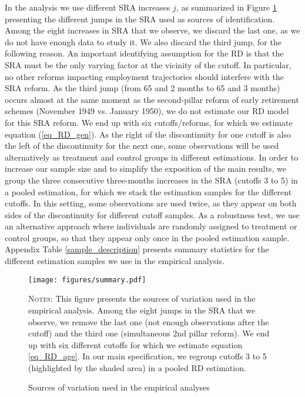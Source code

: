 \documentclass[12pt,a4paper]{article}
\begin{document}
In the analysis we use different SRA increases $j$, as summarized in Figure \ref{rdd_setup} presenting the different jumps in the SRA used as sources of identification. Among the eight increases in SRA that we observe, we discard the last one, as we do not have enough data to study it. We also discard the third jump, for the following reason. An important identifying assumption for the RD is that the SRA must be the only varying factor at the vicinity of the cutoff. In particular, no other reforms impacting employment trajectories should interfere with the SRA reform. As the third jump (from 65 and 2 months to 65 and 3 months) occurs almost at the same moment as the second-pillar reform of early retirement schemes (November 1949 vs. January 1950), we do not estimate our RD model for this SRA reform.  We end up with six cutoffs/reforms, for which we estimate equation (\ref{eq_RD_gen}).  
As the right of the discontinuity for one cutoff is also the left of the discontinuity for the next one, some observations will be used alternatively as treatment and control groups in different estimations. In order to increase our sample size and to simplify the exposition of the main results, we group the three consecutive three-months increases in the SRA (cutoffs 3 to 5) in a pooled estimation, for which we stack the estimation samples for the different cutoffs. In this setting, some observations are used twice, as they appear on both sides of the discontinuity for different cutoff samples. As a robustness test, we use an alternative approach where individuals are randomly assigned to treatment or control groups, so that they appear only once in the pooled estimation sample. Appendix Table \ref{sample_description} presents summary statistics for the different estimation samples we use in the empirical analysis. 

\begin{figure}[!t]
	\caption{Sources of variation used in the empirical analyses}
\label{rdd_setup}
	\centering
	\texttt{[image: figures/summary.pdf]}
 	\begin{minipage}{15cm}%
  \footnotesize
	\textsc{Notes:}  This figure presents the sources of variation used in the empirical analysis. Among the eight jumps in the SRA that we observe, we remove the last one (not enough observations after the cutoff) and the third one (simultaneous 2nd pillar reform). We end up with six different cutoffs for which we estimate equation \ref{eq_RD_age}. In our main specification, we regroup cutoffs 3 to 5 (highlighted by the shaded area) in a pooled RD estimation. 
	\end{minipage}%
\end{figure}
\end{document}
